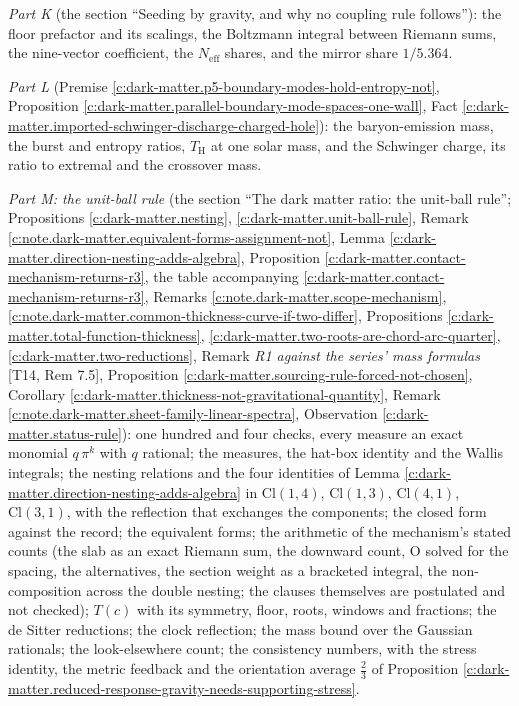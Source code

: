 \documentclass[11pt]{article}
\theoremstyle{definition}
\theoremstyle{plain}
\providecommand{\Cl}{}\renewcommand{\Cl}{\mathrm{Cl}}
\providecommand{\Neff}{}\renewcommand{\Neff}{N_{\mathrm{eff}}}
\begin{document}
\emph{Part K} (the section ``Seeding by gravity, and why no coupling rule follows''): the floor prefactor and its scalings, the Boltzmann integral between Riemann sums, the nine-vector coefficient, the $\Neff$ shares, and the mirror share $1/5.364$.

\emph{Part L} (Premise \ref{c:dark-matter.p5-boundary-modes-hold-entropy-not}, Proposition \ref{c:dark-matter.parallel-boundary-mode-spaces-one-wall}, Fact \ref{c:dark-matter.imported-schwinger-discharge-charged-hole}): the baryon-emission mass, the burst and entropy ratios, $T_{\mathrm{H}}$ at one solar mass, and the Schwinger charge, its ratio to extremal and the crossover mass.

\emph{Part M: the unit-ball rule} (the section ``The dark matter ratio: the unit-ball rule''; Propositions \ref{c:dark-matter.nesting}, \ref{c:dark-matter.unit-ball-rule}, Remark \ref{c:note.dark-matter.equivalent-forms-assignment-not}, Lemma \ref{c:dark-matter.direction-nesting-adds-algebra}, Proposition \ref{c:dark-matter.contact-mechanism-returns-r3}, the table accompanying \ref{c:dark-matter.contact-mechanism-returns-r3}, Remarks \ref{c:note.dark-matter.scope-mechanism}, \ref{c:note.dark-matter.common-thickness-curve-if-two-differ}, Propositions \ref{c:dark-matter.total-function-thickness}, \ref{c:dark-matter.two-roots-are-chord-arc-quarter}, \ref{c:dark-matter.two-reductions}, Remark \emph{R1 against the series' mass formulas} [T14, Rem 7.5], Proposition \ref{c:dark-matter.sourcing-rule-forced-not-chosen}, Corollary \ref{c:dark-matter.thickness-not-gravitational-quantity}, Remark \ref{c:note.dark-matter.sheet-family-linear-spectra}, Observation \ref{c:dark-matter.status-rule}): one hundred and four checks, every measure an exact monomial $q\,\pi^{k}$ with $q$ rational; the measures, the hat-box identity and the Wallis integrals; the nesting relations and the four identities of Lemma \ref{c:dark-matter.direction-nesting-adds-algebra} in $\Cl(1,4)$, $\Cl(1,3)$, $\Cl(4,1)$, $\Cl(3,1)$, with the reflection that exchanges the components; the closed form against the record; the equivalent forms; the arithmetic of the mechanism's stated counts (the slab as an exact Riemann sum, the downward count, O solved for the spacing, the alternatives, the section weight as a bracketed integral, the non-composition across the double nesting; the clauses themselves are postulated and not checked); $T(c)$ with its symmetry, floor, roots, windows and fractions; the de Sitter reductions; the clock reflection; the mass bound over the Gaussian rationals; the look-elsewhere count; the consistency numbers, with the stress identity, the metric feedback and the orientation average $\tfrac{2}{3}$ of Proposition \ref{c:dark-matter.reduced-response-gravity-needs-supporting-stress}.
\end{document}
